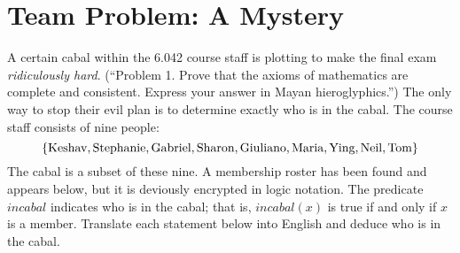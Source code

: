 \documentclass[12pt]{article}
\newcommand{\C}{\textit{incabal}}
\begin{document}

\section{Team Problem:  A Mystery}

A certain cabal within the 6.042 course staff is plotting to make the
final exam \textit{ridiculously hard}.  (``Problem 1.  Prove that the
axioms of mathematics are complete and consistent.  Express your
answer in Mayan hieroglyphics.'')  The only way to stop their evil plan
is to determine exactly who is in the cabal.  The course staff
consists of nine people:
%
\[
\left\{\text{Keshav}, \text{Stephanie}, \text{Gabriel}, \text{Sharon}, \text{Giuliano}, \text{Maria}, \text{Ying}, \text{Neil}, \text{Tom}\right\}
\]
%
The cabal is a subset of these nine.  A membership roster has been
found and appears below, but it is deviously encrypted in logic
notation.  The predicate $\C$ indicates who is in the cabal; that is,
$\C(x)$ is true if and only if $x$ is a member.  Translate each
statement below into English and deduce who is in the cabal.
\end{document}
